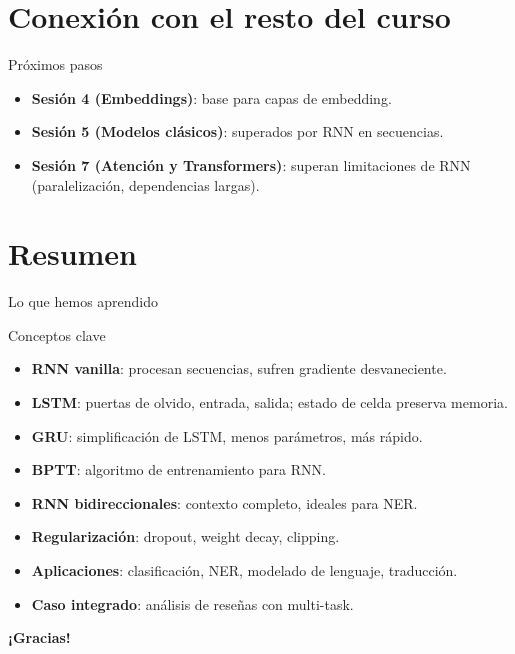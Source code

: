 \documentclass[aspectratio=169, 10pt, xcolor=table]{beamer}
\begin{document}
\section{Conexión con el resto del curso}

\begin{frame}{Próximos pasos}
    \begin{itemize}
        \item \textbf{Sesión 4 (Embeddings)}: base para capas de embedding.
        \item \textbf{Sesión 5 (Modelos clásicos)}: superados por RNN en secuencias.
        \item \textbf{Sesión 7 (Atención y Transformers)}: superan limitaciones de RNN (paralelización, dependencias largas).
    \end{itemize}
\end{frame}

\section{Resumen}

\begin{frame}{Lo que hemos aprendido}
    \begin{exampleblock}{Conceptos clave}
        \begin{itemize}
            \item \textbf{RNN vanilla}: procesan secuencias, sufren gradiente desvaneciente.
            \item \textbf{LSTM}: puertas de olvido, entrada, salida; estado de celda preserva memoria.
            \item \textbf{GRU}: simplificación de LSTM, menos parámetros, más rápido.
            \item \textbf{BPTT}: algoritmo de entrenamiento para RNN.
            \item \textbf{RNN bidireccionales}: contexto completo, ideales para NER.
            \item \textbf{Regularización}: dropout, weight decay, clipping.
            \item \textbf{Aplicaciones}: clasificación, NER, modelado de lenguaje, traducción.
            \item \textbf{Caso integrado}: análisis de reseñas con multi-task.
        \end{itemize}
    \end{exampleblock}
\end{frame}

\begin{frame}
    \centering
    \Huge \textbf{¡Gracias!}

\end{frame}
\end{document}
